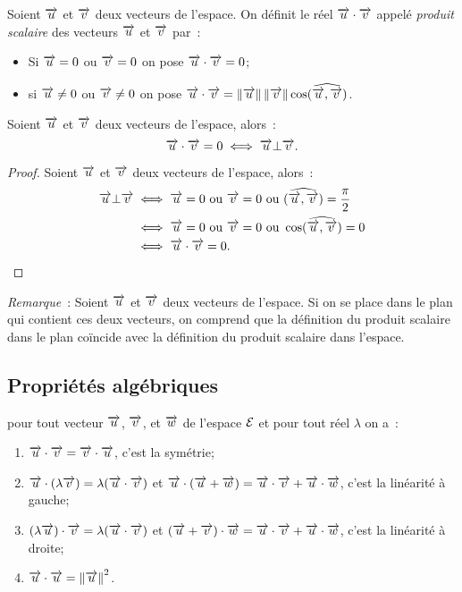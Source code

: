 \begin{defdef}
  Soient \(\vu\) et \(\vv\) deux vecteurs de l'espace. On définit le réel 
  \(\vu\cdot\vv\) appelé \emph{produit scalaire} des vecteurs \(\vu\) et \(\vv\) 
  par~:
  \begin{itemize}
    \item Si \(\vu = 0\) ou \(\vv = 0\) on pose \(\vu\cdot\vv = 0\);
    \item si \(\vu\neq 0\) ou \(\vv\neq 0\) on pose \(\vu\cdot\vv = 
      \norme{\vu}\norme{\vv}\cos(\widehat{\vu, \vv})\).
  \end{itemize}
\end{defdef}

\begin{prop}
  Soient \(\vu\) et \(\vv\) deux vecteurs de l'espace, alors~:
  \begin{equation}
    \vu\cdot\vv = 0 \iff \vu \bot \vv.
  \end{equation}
\end{prop}

\begin{proof}
  Soient \(\vu\) et \(\vv\) deux vecteurs de l'espace, alors~:
  \begin{align}
    \vu \bot \vv &\iff \vu = 0 \text{~ou~} \vv = 0 \text{~ou~} (\widehat{\vu, 
    \vv}) = \frac{\pi}{2}\\
                 &\iff \vu = 0 \text{~ou~} \vv = 0 \text{~ou~} 
                 \cos(\widehat{\vu, \vv}) = 0\\
                 &\iff \vu\cdot\vv = 0.
  \end{align}
\end{proof}

\emph{Remarque}~: Soient \(\vu\) et \(\vv\) deux vecteurs de l'espace. Si on 
se place dans le plan qui contient ces deux vecteurs, on comprend que la 
définition du produit scalaire dans le plan coïncide avec la définition du 
produit scalaire dans l'espace.

\subsection{Propriétés algébriques}
\begin{prop}
  \label{prop:propalgprodsc}
  pour tout vecteur \(\vu\), \(\vv\), et \(\vw\) de l'espace \(\E\) et pour 
  tout réel \(\lambda\) on a~:
  \begin{enumerate}
    \item \(\vu\cdot\vv = \vv\cdot\vu\), c'est la symétrie;
    \item \(\vu\cdot(\lambda\vv) = \lambda(\vu\cdot\vv)\) et \(\vu\cdot(\vu + 
      \vw) = \vu\cdot\vv + \vu\cdot\vw\), c'est la linéarité à gauche;
    \item \((\lambda\vu)\cdot\vv = \lambda(\vu\cdot\vv)\) et \((\vu + 
      \vv)\cdot\vw = \vu\cdot\vv + \vu\cdot\vw\), c'est la linéarité à droite;
    \item \(\vu\cdot\vu = \norme{\vu}^2\).
  \end{enumerate}
\end{prop}

